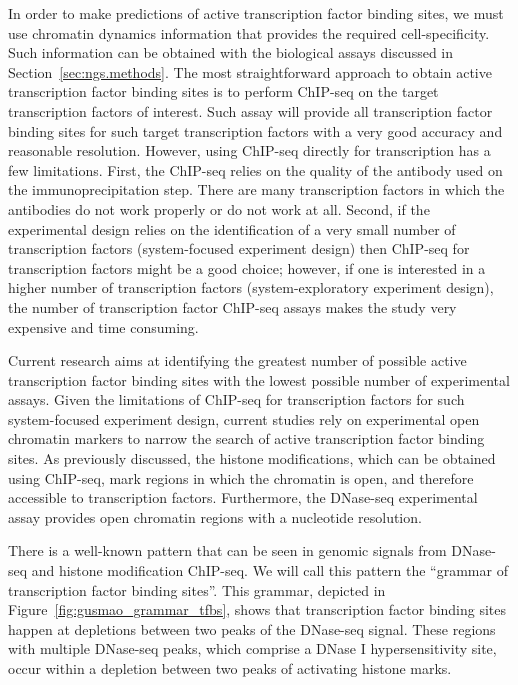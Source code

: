 In order to make predictions of active transcription factor binding sites, we must use chromatin dynamics information that provides the required cell-specificity. Such information can be obtained with the biological assays discussed in Section~\ref{sec:ngs.methods}. The most straightforward approach to obtain active transcription factor binding sites is to perform ChIP-seq on the target transcription factors of interest. Such assay will provide all transcription factor binding sites for such target transcription factors with a very good accuracy and reasonable resolution. However, using ChIP-seq directly for transcription has a few limitations. First, the ChIP-seq relies on the quality of the antibody used on the immunoprecipitation step. There are many transcription factors in which the antibodies do not work properly or do not work at all. Second, if the experimental design relies on the identification of a very small number of transcription factors (system-focused experiment design) then ChIP-seq for transcription factors might be a good choice; however, if one is interested in a higher number of transcription factors (system-exploratory experiment design), the number of transcription factor ChIP-seq assays makes the study very expensive and time consuming.

Current research aims at identifying the greatest number of possible active transcription factor binding sites with the lowest possible number of experimental assays. Given the limitations of ChIP-seq for transcription factors for such system-focused experiment design, current studies rely on experimental open chromatin markers to narrow the search of active transcription factor binding sites. As previously discussed, the histone modifications, which can be obtained using ChIP-seq, mark regions in which the chromatin is open, and therefore accessible to transcription factors. Furthermore, the DNase-seq experimental assay provides open chromatin regions with a nucleotide resolution.

There is a well-known pattern that can be seen in genomic signals from DNase-seq and histone modification ChIP-seq. We will call this pattern the ``grammar of transcription factor binding sites''. This grammar, depicted in Figure~\ref{fig:gusmao_grammar_tfbs}, shows that transcription factor binding sites happen at depletions between two peaks of the DNase-seq signal. These regions with multiple DNase-seq peaks, which comprise a DNase I hypersensitivity site, occur within a depletion between two peaks of activating histone marks.

